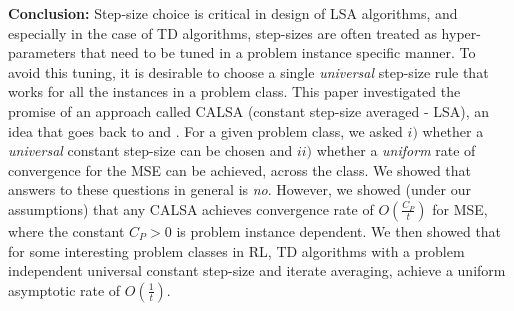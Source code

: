 \textbf{Conclusion:} 
Step-size choice is critical in design of LSA algorithms, and especially in the case of TD algorithms, step-sizes are often treated as hyper-parameters that need to be tuned in a problem instance specific manner. To avoid this tuning, it is desirable to choose a single \emph{universal} step-size rule that works for all the instances in a problem class. This paper investigated the promise of an approach called CALSA (constant step-size averaged - LSA), an idea that goes back to \citet{ruppert} and \citet{polyak-jusidky}. For a given problem class, we asked $i)$ whether a \emph{universal} constant step-size can be chosen and $ii)$ whether a \emph{uniform} rate of convergence for the MSE can be achieved, across the class. We showed that answers to these questions in general is \emph{no}. However, we showed (under our assumptions) that any CALSA achieves convergence rate of $O(\frac{C_P}{t})$ for MSE, where the constant $C_P>0$ is problem instance dependent. We then showed that for some interesting problem classes in RL, TD algorithms with a problem independent universal constant step-size and iterate averaging, achieve a uniform asymptotic rate of $O(\frac{1}{t})$. 